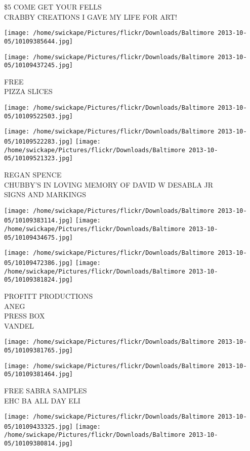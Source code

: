 \documentclass[10pt,letterpaper]{article}
\begin{document}
\$5 COME GET YOUR FELLS\\
CRABBY CREATIONS I GAVE MY LIFE FOR ART!
\pagebreak

\texttt{[image: /home/swickape/Pictures/flickr/Downloads/Baltimore 2013-10-05/10109385644.jpg]}

\vspace{0.25in}
\texttt{[image: /home/swickape/Pictures/flickr/Downloads/Baltimore 2013-10-05/10109437245.jpg]}

FREE\\
PIZZA SLICES
\pagebreak

\texttt{[image: /home/swickape/Pictures/flickr/Downloads/Baltimore 2013-10-05/10109522503.jpg]}

\vspace{0.25in}
\texttt{[image: /home/swickape/Pictures/flickr/Downloads/Baltimore 2013-10-05/10109522283.jpg]}
\texttt{[image: /home/swickape/Pictures/flickr/Downloads/Baltimore 2013-10-05/10109521323.jpg]}

REGAN SPENCE\\
CHUBBY'S IN LOVING MEMORY OF DAVID W DESABLA JR\\
SIGNS AND MARKINGS
\pagebreak

\texttt{[image: /home/swickape/Pictures/flickr/Downloads/Baltimore 2013-10-05/10109383114.jpg]}
\texttt{[image: /home/swickape/Pictures/flickr/Downloads/Baltimore 2013-10-05/10109434675.jpg]}

\texttt{[image: /home/swickape/Pictures/flickr/Downloads/Baltimore 2013-10-05/10109472386.jpg]}
\texttt{[image: /home/swickape/Pictures/flickr/Downloads/Baltimore 2013-10-05/10109381824.jpg]}

PROFITT PRODUCTIONS\\
ANEG\\
PRESS BOX\\
VANDEL
\pagebreak

\texttt{[image: /home/swickape/Pictures/flickr/Downloads/Baltimore 2013-10-05/10109381765.jpg]}

\vspace{0.25in}
\texttt{[image: /home/swickape/Pictures/flickr/Downloads/Baltimore 2013-10-05/10109381464.jpg]}

FREE SABRA SAMPLES\\
EHC BA ALL DAY ELI
\pagebreak

\texttt{[image: /home/swickape/Pictures/flickr/Downloads/Baltimore 2013-10-05/10109433325.jpg]}
\texttt{[image: /home/swickape/Pictures/flickr/Downloads/Baltimore 2013-10-05/10109380814.jpg]}
\end{document}
